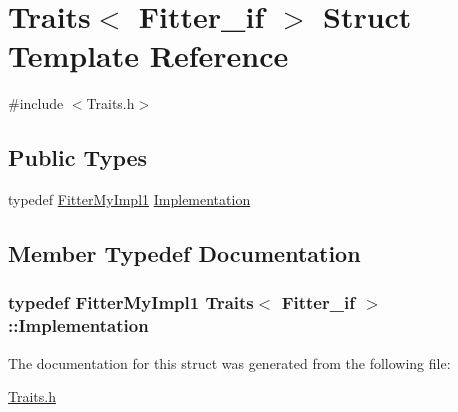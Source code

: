 \hypertarget{struct_traits_3_01_fitter__if_01_4}{\section{Traits$<$ Fitter\-\_\-if $>$ Struct Template Reference}
\label{struct_traits_3_01_fitter__if_01_4}
}


{\ttfamily \#include $<$Traits.\-h$>$}

\subsection*{Public Types}
\begin{DoxyCompactItemize}
\item 
typedef \hyperlink{class_fitter_my_impl1}{Fitter\-My\-Impl1} \hyperlink{struct_traits_3_01_fitter__if_01_4_ae583860c62ded7016b4d038d17b9b480}{Implementation}
\end{DoxyCompactItemize}


\subsection{Member Typedef Documentation}
\hypertarget{struct_traits_3_01_fitter__if_01_4_ae583860c62ded7016b4d038d17b9b480}{
\subsubsection[{Implementation}]{\setlength{\rightskip}{0pt plus 5cm}typedef {\bf Fitter\-My\-Impl1} {\bf Traits}$<$ {\bf Fitter\-\_\-if} $>$\-::{\bf Implementation}}}\label{struct_traits_3_01_fitter__if_01_4_ae583860c62ded7016b4d038d17b9b480}


The documentation for this struct was generated from the following file\-:\begin{DoxyCompactItemize}
\item 
\hyperlink{_traits_8h}{Traits.\-h}\end{DoxyCompactItemize}
